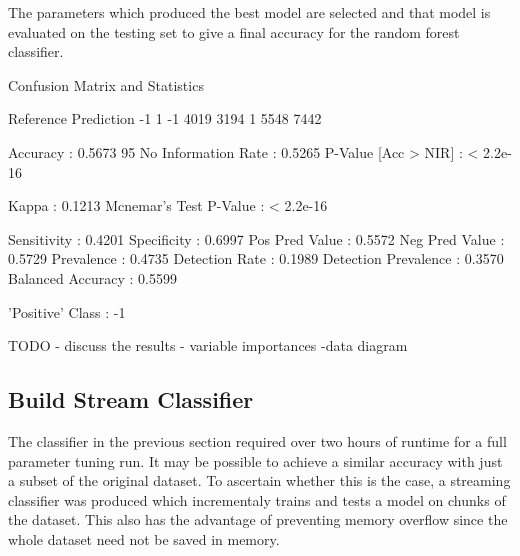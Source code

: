 \documentclass[10pt]{article}
\begin{document}
The parameters which produced the best model are selected and that model is evaluated on the testing set to give a final accuracy for the random forest classifier.
\begin{Schunk}
\begin{Soutput}
Confusion Matrix and Statistics

          Reference
Prediction   -1    1
        -1 4019 3194
        1  5548 7442
                                          
               Accuracy : 0.5673          
                 95%
    No Information Rate : 0.5265          
    P-Value [Acc > NIR] : < 2.2e-16       
                                          
                  Kappa : 0.1213          
 Mcnemar's Test P-Value : < 2.2e-16       
                                          
            Sensitivity : 0.4201          
            Specificity : 0.6997          
         Pos Pred Value : 0.5572          
         Neg Pred Value : 0.5729          
             Prevalence : 0.4735          
         Detection Rate : 0.1989          
   Detection Prevalence : 0.3570          
      Balanced Accuracy : 0.5599          
                                          
       'Positive' Class : -1              
\end{Soutput}
\end{Schunk}
TODO - discuss the results
    - variable importances
    -data diagram
  

\subsection{Build Stream Classifier}

The classifier in the previous section required over two hours of runtime for a full parameter tuning run. It may be possible to achieve a similar accuracy with just a subset of the original dataset. To ascertain whether this is the case, a streaming classifier was produced which incrementaly trains and tests a model on chunks of the dataset. This also has the advantage of preventing memory overflow since the whole dataset need not be saved in memory.
\end{document}
